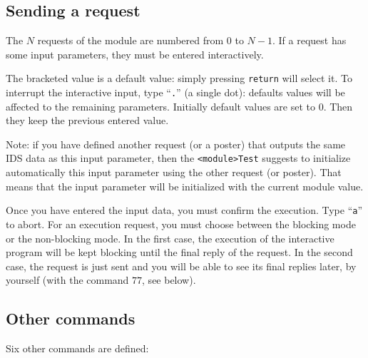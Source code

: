 \subsection{Sending a request}

The $N$ requests of the module are numbered from $0$ to $N-1$. If a
request has some input parameters, they must be entered interactively.

The bracketed value is a default value: simply pressing \texttt{return} will
select  it.  To  interrupt the interactive  input,  type  ``\texttt{.}''  (a
single   dot):   defaults  values  will   be  affected   to the remaining
parameters. Initially default values are set to $0$.  Then they keep the
previous entered value.

Note: if you have defined another request (or a poster) that outputs the
same IDS data as this input parameter, then the \texttt{<module>Test}
suggests to initialize automatically this input parameter using the other
request (or poster). That means that the input parameter will be
initialized with the current module value.

Once    you  have  entered  the   input   data, you    must  confirm  the
execution. Type ``\texttt{a}'' to abort.  For an execution request, you must
choose between  the blocking mode or the  non-blocking mode. In the first
case,  the execution  of  the interactive program  will be  kept blocking
until the final reply of the request.  In the second case, the request is
just sent and  you  will be  able to  see   its final replies   later, by
yourself (with the command $77$, see below).


\subsection{Other commands}

Six other commands are defined:

